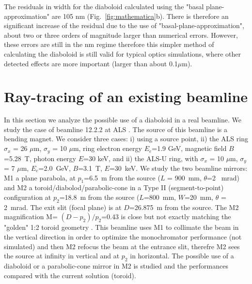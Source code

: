 \documentclass{iucr}              %
\begin{document}

The residuals in width for the diaboloid calculated  using the "basal plane-approximation" are 105 nm (Fig.~\ref{fig:mathematica}b). There is therefore an significant increase of the residual due to the use of "basal-plane-approximation", about two or three orders of magnitude larger than numerical errors. However, these errors are still in the nm regime therefore this simpler method of calculating the diaboloid is still valid for typical optics simulations, where other detected effects are more important (larger than about 0.1$\mu$m).


\section{Ray-tracing of an existing beamline}
\label{sec:beamline}

In this section we analyze the possible use of a diaboloid in a real beamline. We study the case of beamline 12.2.2  at ALS \cite{bl1222} \cite{MacDowell2004}. The source of this beamline is a bending magnet. We consider three cases: i) using a source point, ii) the ALS ring
$\sigma_x$ = 26 $\mu$m, $\sigma_y$ = 10 $\mu$m, ring electron energy $E_e$=1.9 GeV, magnetic field $B$=5.28~T, photon energy $E$=30 keV, and ii) the ALS-U ring, with $\sigma_x$ = 10 $\mu$m, $\sigma_y$ = 7 $\mu$m, $E_e$=2.0~GeV, $B$=3.1~T, $E$=30~keV. We study the two beamline mirrors: M1 a plane parabola, at $p_1$=6.5~m from the source ($L$ = 900~mm, $\theta$=2 ~mrad) and M2 a toroid/diabolod/parabolic-cone in a Type II (segment-to-point) configuration at $p_2$=18.8~m from the source ($L$=800~mm, $W$=20~mm, $\theta$ = 2~mrad. The exit slit (focal plane) is at $D$=26.875~m from the source.  The M2 magnification M= $(D-p_2)/p_2$=0.43 is close but not exactly matching the "golden" 1:2 toroid geometry \cite{padmore2000, howells2000}. This beamline uses M1 to collimate the beam in the vertical direction in order to optimize the monochromator performance (not simulated) and then M2 refocus the beam at the entrance slit, therefre M2 sees the source at infinity in vertical and at $p_2$ in horizontal. The possible use of a diaboloid or a parabolic-cone mirror in M2 is studied and the performances compared with the current solution (toroid).
\end{document}
